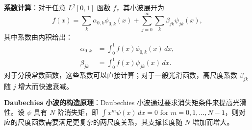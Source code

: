 \textbf{系数计算}：对于任意 $L^2[0,1]$ 函数 $f$，其小波展开为
\begin{equation}
f(x) = \sum_k \alpha_{0,k} \phi_{0,k}(x) + \sum_{j=0}^{\infty} \sum_k \beta_{jk} \psi_{jk}(x),
\label{eq:wavelet-expansion}
\end{equation}
其中系数由内积给出：
\begin{align}
\alpha_{0,k} &= \int_0^1 f(x) \phi_{0,k}(x)\, dx, \label{eq:haar-scale-coefficient} \\
\beta_{jk} &= \int_0^1 f(x) \psi_{jk}(x)\, dx. \label{eq:haar-wavelet-coefficient}
\end{align}
对于分段常数函数，这些系数可以直接计算；对于一般光滑函数，高尺度系数 $\beta_{jk}$ 随 $j$ 增大而快速衰减。

\textbf{Daubechies 小波的构造原理}：Daubechies 小波通过要求消失矩条件来提高光滑性。设 $\psi$ 具有 $N$ 阶消失矩，即 $\int x^m \psi(x)\, dx = 0$ for $m = 0, 1, \ldots, N-1$，则对应的尺度函数需要满足更复杂的两尺度关系，其支撑长度随 $N$ 增加而增大。

\endinput
